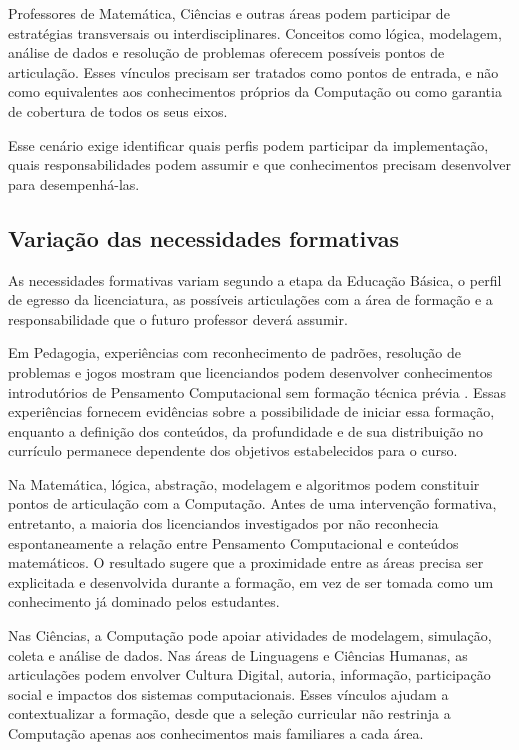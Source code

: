 Professores de Matemática, Ciências e outras áreas podem participar de estratégias transversais ou interdisciplinares. Conceitos como lógica, modelagem, análise de dados e resolução de problemas oferecem possíveis pontos de articulação. Esses vínculos precisam ser tratados como pontos de entrada, e não como equivalentes aos conhecimentos próprios da Computação ou como garantia de cobertura de todos os seus eixos.

Esse cenário exige identificar quais perfis podem participar da implementação, quais responsabilidades podem assumir e que conhecimentos precisam desenvolver para desempenhá-las.

\subsection{Variação das necessidades formativas}
\label{subsec:variacao-necessidades-licenciaturas}

As necessidades formativas variam segundo a etapa da Educação Básica, o perfil de egresso da licenciatura, as possíveis articulações com a área de formação e a responsabilidade que o futuro professor deverá assumir.

Em Pedagogia, experiências com reconhecimento de padrões, resolução de problemas e jogos mostram que licenciandos podem desenvolver conhecimentos introdutórios de Pensamento Computacional sem formação técnica prévia \cite{correa2020pensamento}. Essas experiências fornecem evidências sobre a possibilidade de iniciar essa formação, enquanto a definição dos conteúdos, da profundidade e de sua distribuição no currículo permanece dependente dos objetivos estabelecidos para o curso.

Na Matemática, lógica, abstração, modelagem e algoritmos podem constituir pontos de articulação com a Computação. Antes de uma intervenção formativa, entretanto, a maioria dos licenciandos investigados por  não reconhecia espontaneamente a relação entre Pensamento Computacional e conteúdos matemáticos. O resultado sugere que a proximidade entre as áreas precisa ser explicitada e desenvolvida durante a formação, em vez de ser tomada como um conhecimento já dominado pelos estudantes.


Nas Ciências, a Computação pode apoiar atividades de modelagem, simulação, coleta e análise de dados. Nas áreas de Linguagens e Ciências Humanas, as articulações podem envolver Cultura Digital, autoria, informação, participação social e impactos dos sistemas computacionais. Esses vínculos ajudam a contextualizar a formação, desde que a seleção curricular não restrinja a Computação apenas aos conhecimentos mais familiares a cada área.

